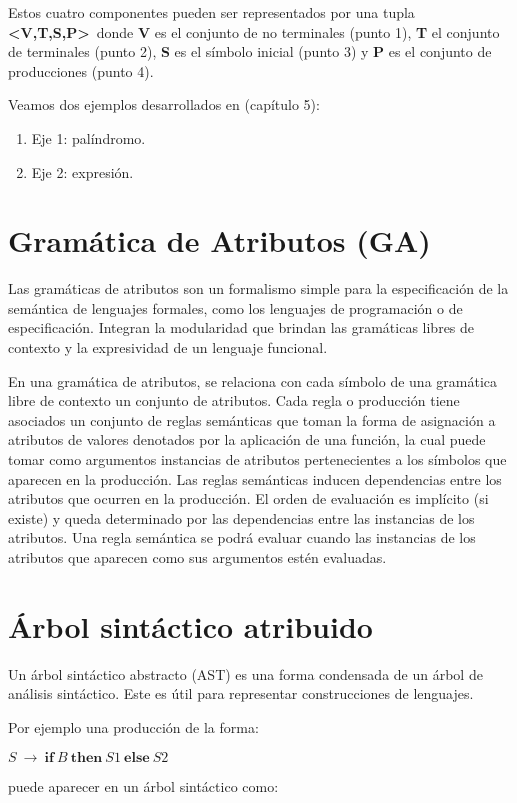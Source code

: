 Estos cuatro componentes pueden ser representados por una tupla \textbf{<V,T,S,P>}\ donde \textbf{V} es el conjunto de no terminales (punto 1), \textbf{T} el conjunto de terminales (punto 2), \textbf{S} es el símbolo inicial (punto 3) y \textbf{P} es el conjunto de producciones (punto 4).

Veamos dos ejemplos desarrollados en \cite{gramática} (capítulo 5):

\begin{enumerate}
\item Eje 1: palíndromo.
\item Eje 2: expresión.
\end{enumerate}
 

\section{Gramática de Atributos (GA)}

Las gramáticas de atributos son un formalismo simple para la especificación de la semántica de lenguajes formales, como los lenguajes de programación o de especificación. Integran la modularidad que brindan las gramáticas libres de contexto y la expresividad de un lenguaje funcional.

En una gramática de atributos, se relaciona con cada símbolo de una gramática libre de contexto un conjunto de atributos. Cada regla o producción tiene asociados un conjunto de reglas semánticas que toman la forma de asignación a atributos de valores denotados por la aplicación de una función, la cual puede tomar como argumentos instancias de atributos pertenecientes a los símbolos que aparecen en la producción.
Las reglas semánticas inducen dependencias entre los atributos que ocurren en la producción. El orden de evaluación es implícito (si existe) y queda determinado por las dependencias entre las instancias de los atributos.
Una regla semántica se podrá evaluar cuando las instancias de los atributos que aparecen como sus argumentos estén evaluadas. 



\section{Árbol sintáctico atribuido}

Un árbol sintáctico abstracto (AST) es una forma condensada de un árbol de análisis sintáctico. Este es útil para representar construcciones de lenguajes.

Por ejemplo una producción de la forma:
\begin{center}\LARGE
$S\ \rightarrow\ \textbf{if}\ B\ \textbf{then}\ S1\ \textbf{else}\ S2$                                                                      \end{center}
puede aparecer en un árbol sintáctico como:

